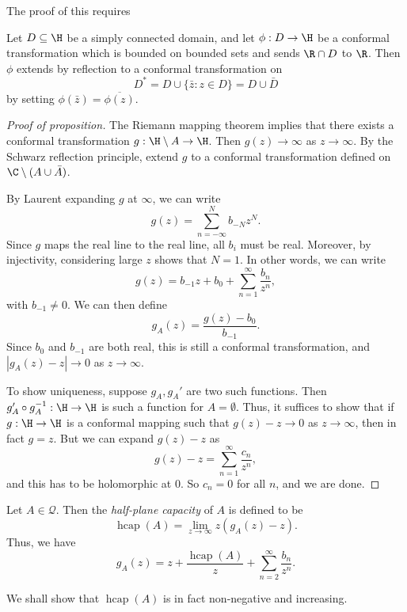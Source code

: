 \documentclass[a4paper]{article}
\DeclareMathOperator\hcap{hcap}
\begin{document}
The proof of this requires
\begin{thm}
  Let $D \subseteq \H$ be a simply connected domain, and let $\phi: D \to \H$ be a conformal transformation which is bounded on bounded sets and sends $\R \cap D$ to $\R$. Then $\phi$ extends by reflection to a conformal transformation on
  \[
    D^* = D \cup \{\bar{z} : z \in D\} = D \cup \bar{D}
  \]
  by setting $\phi(\bar{z}) = \overline{\phi(z)}$.\fakeqed
\end{thm}

\begin{proof}[Proof of proposition]
  The Riemann mapping theorem implies that there exists a conformal transformation $g: \H \setminus A \to \H$. Then $g(z) \to \infty$ as $z \to \infty$. By the Schwarz reflection principle, extend $g$ to a conformal transformation defined on $\C \setminus (A \cup \bar{A})$.

  By Laurent expanding $g$ at $\infty$, we can write
  \[
    g(z) = \sum_{n = -\infty}^N b_{-N} z^N.
  \]
  Since $g$ maps the real line to the real line, all $b_i$ must be real. Moreover, by injectivity, considering large $z$ shows that $N = 1$. In other words, we can write
  \[
    g(z) = b_{-1} z + b_0 + \sum_{n = 1}^\infty \frac{b_n}{z^n},
  \]
  with $b_{-1} \not= 0$. We can then define
  \[
    g_A(z) = \frac{g(z) - b_0}{b_{-1}}.
  \]
  Since $b_0$ and $b_{-1}$ are both real, this is still a conformal transformation, and $|g_A(z) - z| \to 0$ as $z \to \infty$.

  To show uniqueness, suppose $g_A, g_A'$ are two such functions. Then $g_A' \circ g_A^{-1}: \H \to \H$ is such a function for $A = \emptyset$. Thus, it suffices to show that if $g: \H \to \H$ is a conformal mapping such that $g(z) - z \to 0$ as $z \to \infty$, then in fact $g = z$. But we can expand $g(z) - z$ as
  \[
    g(z) - z = \sum_{n = 1}^\infty \frac{c_n}{z^n},
  \]
  and this has to be holomorphic at $0$. So $c_n = 0$ for all $n$, and we are done.
\end{proof}

\begin{defi}
  Let $A \in \mathcal{Q}$. Then the \emph{half-plane capacity} of $A$ is defined to be
  \[
    \hcap(A) = \lim_{z \to \infty} z(g_A(z) - z).
  \]
  Thus, we have
  \[
    g_A(z) = z + \frac{\hcap(A)}{z} + \sum_{n = 2}^\infty \frac{b_n}{z^n}.
  \]
\end{defi}
We shall show that $\hcap(A)$ is in fact non-negative and increasing.
\end{document}
